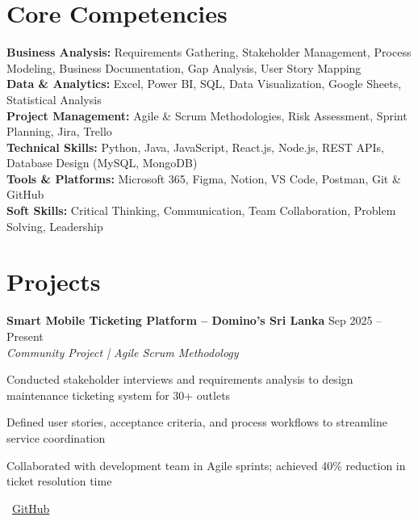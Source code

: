 \documentclass[letterpaper,10pt]{article}
\newenvironment{resume_list}{
  \vspace{-2pt}
  \begin{itemize}[itemsep=1pt, leftmargin=14pt]
}{
  \end{itemize}\vspace{-3pt}
}
\begin{document}
\section{Core Competencies}
\vspace{-1pt}

\textbf{Business Analysis:} Requirements Gathering, Stakeholder Management, Process Modeling, Business Documentation, Gap Analysis, User Story Mapping\\[2pt]
\textbf{Data \& Analytics:} Excel, Power BI, SQL, Data Visualization, Google Sheets, Statistical Analysis\\[2pt]
\textbf{Project Management:} Agile \& Scrum Methodologies, Risk Assessment, Sprint Planning, Jira, Trello\\[2pt]
\textbf{Technical Skills:} Python, Java, JavaScript, React.js, Node.js, REST APIs, Database Design (MySQL, MongoDB)\\[2pt]
\textbf{Tools \& Platforms:} Microsoft 365, Figma, Notion, VS Code, Postman, Git \& GitHub\\[2pt]
\textbf{Soft Skills:} Critical Thinking, Communication, Team Collaboration, Problem Solving, Leadership

\section{Projects}
\vspace{-1pt}

\textbf{Smart Mobile Ticketing Platform – Domino's Sri Lanka} \hfill Sep 2025 – Present\\
\textit{Community Project | Agile Scrum Methodology}\\
\begin{resume_list}
  \item Conducted stakeholder interviews and requirements analysis to design maintenance ticketing system for 30+ outlets
  \item Defined user stories, acceptance criteria, and process workflows to streamline service coordination
  \item Collaborated with development team in Agile sprints; achieved 40\% reduction in ticket resolution time
  \item \faGithub~\href{https://github.com/fixpoint-tech}{GitHub}
\end{resume_list}
\end{document}
